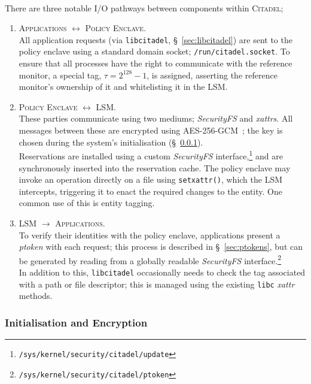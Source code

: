 \paragraph{} There are three notable I/O pathways between components within \textsc{Citadel};
\begin{enumerate}
    \item \textsc{Applications $\longleftrightarrow$ Policy Enclave}. \\
    All application requests (via \texttt{libcitadel}, §~\ref{sec:libcitadel}) are sent to the policy enclave using a standard domain socket; \texttt{/run/citadel.socket}. To ensure that all processes have the right to communicate with the reference monitor, a special tag, $\tau = 2^{128} -1$, is assigned, asserting the reference monitor's ownership of it and whitelisting it in the LSM.
    \item \textsc{Policy Enclave $\longleftrightarrow$ LSM}. \\
    These parties communicate using two mediums; \textit{SecurityFS} and \textit{xattrs}. All messages between these are encrypted using AES-256-GCM~\cite{Rijndael,McGrew2005TheGM}; the key is chosen during the system's initialisation (§~\ref{sec:initialisation}). \\
    Reservations are installed using a custom \textit{SecurityFS} interface,\footnote{\texttt{/sys/kernel/security/citadel/update}} and are synchronously inserted into the reservation cache. The policy enclave may invoke an operation directly on a file using \texttt{setxattr()}, which the LSM intercepts, triggering it to enact the required changes to the entity. One common use of this is entity tagging.
    \item \textsc{LSM $\longrightarrow$ Applications}. \\
    To verify their identities with the policy enclave, applications present a \textit{ptoken} with each request; this process is described in §~\ref{sec:ptokens}, but can be generated by reading from a globally readable \textit{SecurityFS} interface.\footnote{\texttt{/sys/kernel/security/citadel/ptoken}} \\
    In addition to this, \texttt{libcitadel} occasionally needs to check the tag associated with a path or file descriptor; this is managed using the existing \texttt{libc} \textit{xattr} methods.
\end{enumerate}

\subsubsection{Initialisation and Encryption}
\label{sec:initialisation}
